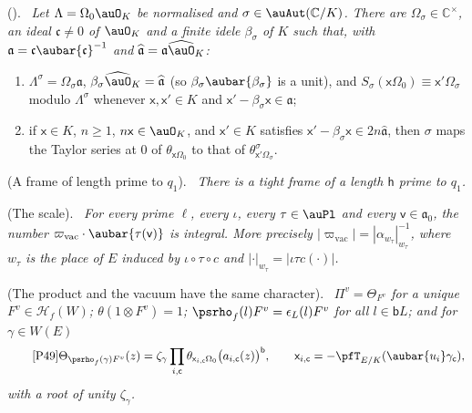 \documentclass[10pt]{amsart}
\theoremstyle{definition}
\theoremstyle{remark}
\newcommand{\C}{\mathbb C}
\providecommand{\psHS}{\mathcal H}
\newenvironment{quotedthm}[2]{\par\medskip\noindent\begingroup
  \textbf{#1}#2.\ \itshape\ignorespaces}{\endgroup\par\medskip}
\begin{document}
\begin{quotedthm}{\cite[Theorem~7.9]{P49}}{ ({\cite[Proposition~5.25{\rm(C3)(ii)}]{P49}})}
Let $\Lambda=\Omega_0\auO_K$ be normalised and $\sigma\in\auAut(\C/K)$. There are $\Omega_\sigma
\in\C^\times$, an ideal $\mathfrak c\ne0$ of $\auO_K$ and a finite idele $\beta_\sigma$ of $K$ such
that, with $\mathfrak a=\mathfrak c\aubar{\mathfrak c}^{-1}$ and $\widehat{\mathfrak a}=\mathfrak
a\widehat\auO_K$:
\begin{enumerate}
\item[(a)] $\Lambda^\sigma=\Omega_\sigma\mathfrak a$, $\beta_\sigma\widehat\auO_K=\widehat{
\mathfrak a}$ (so $\beta_\sigma\aubar{\beta_\sigma}$ is a unit), and $S_\sigma(\mathsf x\Omega_0)
\equiv\mathsf x'\Omega_\sigma$ modulo $\Lambda^\sigma$ whenever $\mathsf x,\mathsf x'\in K$ and
$\mathsf x'-\beta_\sigma\mathsf x\in\widehat{\mathfrak a}$;
\item[(b)] if $\mathsf x\in K$, $n\ge1$, $n\mathsf x\in\auO_K$, and $\mathsf x'\in K$ satisfies
$\mathsf x'-\beta_\sigma\mathsf x\in2n\widehat{\mathfrak a}$, then $\sigma$ maps the Taylor series
at $0$ of $\theta_{\mathsf x\Omega_0}$ to that of $\theta^\sigma_{\mathsf x'\Omega_\sigma}$.
\end{enumerate}
\end{quotedthm}

\begin{quotedthm}{\cite[Lemma~7.11]{P49}}{ (A frame of length prime to $q_1$)}
There is a tight frame of a length $\mathsf h$ prime to $q_1$.
\end{quotedthm}

\begin{quotedthm}{\cite[Lemma~7.12]{P49}}{ (The scale)}
For every prime $\ell$, every $\iota$, every $\tau\in\auPl$ and every $\mathsf v\in\mathfrak a_0$,
the number $\varpi_{\mathrm{vac}}\cdot\aubar{\tau(\mathsf v)}$ is integral. More precisely
$|\varpi_{\mathrm{vac}}|=|\alpha_{w_\tau}|_{w_\tau}^{-1}$, where $w_\tau$ is the place of $E$
induced by $\iota\circ\tau\circ c$ and $|\cdot|_{w_\tau}=|\iota\tau c(\cdot)|$.
\end{quotedthm}

\begin{quotedthm}{\cite[Lemma~7.13]{P49}}{ (The product and the vacuum have the same character)}
$\Pi^v=\Theta_{F^v}$ for a unique $F^v\in\psHS_f(W)$; $\theta(1\otimes F^v)=1$;
$\psrho_f(l)F^v=\epsilon_L(l)F^v$ for all $l\in\mathsf bL$; and for $\gamma\in W(E)$
\begin{equation*}\tag*{{\cite[(73)]{P49}}}
\Theta_{\psrho_f(\gamma)F^v}(z)=\zeta_\gamma\prod_{i,\mathsf c}\theta_{\mathsf x_{i,\mathsf c}
\Omega_0}\bigl(a_{i,\mathsf c}(z)\bigr)^{\mathsf b},\qquad\mathsf x_{i,\mathsf c}=-\pfT_{E/K}(
\aubar{u_i}\gamma_{\mathsf c}),
\end{equation*}
with a root of unity $\zeta_\gamma$.
\end{quotedthm}
\end{document}
